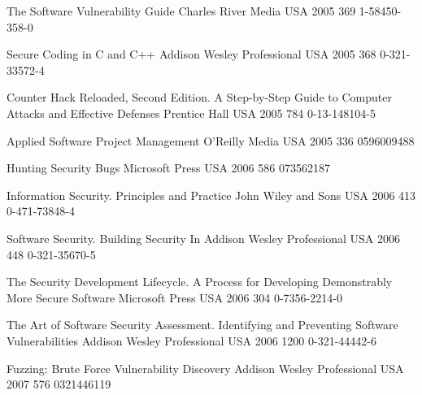 \begin{thebibliography}{9}
		{
			\BibAnd
			}
		{The Software Vulnerability Guide}
		{}
		{Charles River Media}
		{USA}
		{2005}
		{369}
		{1-58450-358-0}
	
		{}
		{Secure Coding in {C} and {C++}}
		{}
		{Addison Wesley Professional}
		{USA}
		{2005}
		{368}
		{0-321-33572-4}
	
		{
			\BibAnd
			}
		{Counter Hack Reloaded, Second Edition. A Step-by-Step Guide to Computer Attacks and Effective Defenses}
		{}
		{Prentice Hall}
		{USA}
		{2005}
		{784}
		{0-13-148104-5}

		{
			\BibAnd
			}
		{Applied Software Project Management}
		{}
		{O'Reilly Media}
		{USA}
		{2005}
		{336}
		{0596009488}
	
		{
			\BibAnd
			\BibAnd
			}
		{Hunting Security Bugs}
		{}
		{Microsoft Press}
		{USA}
		{2006}
		{586}
		{073562187}
	
		{}
		{Information Security. Principles and Practice}
		{}
		{John Wiley and Sons}
		{USA}
		{2006}
		{413}
		{0-471-73848-4}
	
		{}
		{Software Security. Building Security In}
		{}
		{Addison Wesley Professional}
		{USA}
		{2006}
		{448}
		{0-321-35670-5}
	
		{
			\BibAnd
			}
		{The Security Development Lifecycle. A Process for Developing Demonstrably More Secure Software}
		{}
		{Microsoft Press}
		{USA}
		{2006}
		{304}
		{0-7356-2214-0}
	
		{
			\BibAnd
			\BibAnd
			}
		{The Art of Software Security Assessment. Identifying and Preventing Software Vulnerabilities}
		{}
		{Addison Wesley Professional}
		{USA}
		{2006}
		{1200}
		{0-321-44442-6}
	
		{
			\BibAnd
			\BibAnd
			}
		{Fuzzing: Brute Force Vulnerability Discovery}
		{}
		{Addison Wesley Professional}
		{USA}
		{2007}
		{576}
		{0321446119}
	

\end{thebibliography}
